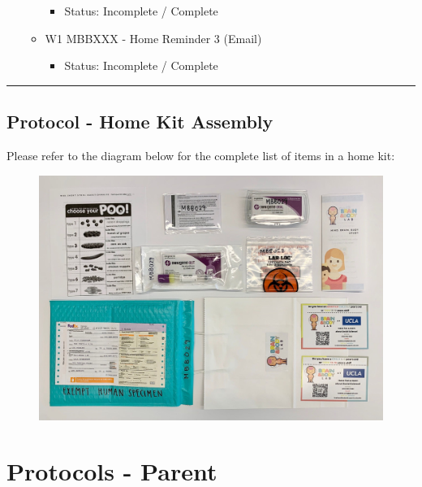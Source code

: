 \documentclass[]{book}
\providecommand{\tightlist}{%
  \setlength{\itemsep}{0pt}\setlength{\parskip}{0pt}}
\begin{document}
\begin{itemize}
\begin{itemize}
    \begin{itemize}
    \tightlist
    \item
      Status: Incomplete / Complete
    \end{itemize}
  \item
    W1 MBBXXX - Home Reminder 3 (Email)

    \begin{itemize}
    \tightlist
    \item
      Status: Incomplete / Complete
    \end{itemize}
  \end{itemize}
\end{itemize}

\begin{center}\rule{0.5\linewidth}{0.5pt}\end{center}

\hypertarget{protocol---home-kit-assembly}{%
\subsection{Protocol - Home Kit Assembly}\label{protocol---home-kit-assembly}}

Please refer to the diagram below for the complete list of items in a home kit:

\begin{figure}
\centering
\includegraphics{images/home_kit/1.jpeg}
\caption{}
\end{figure}

\hypertarget{protocols---parent}{%
\section{Protocols - Parent}\label{protocols---parent}}
\end{document}
